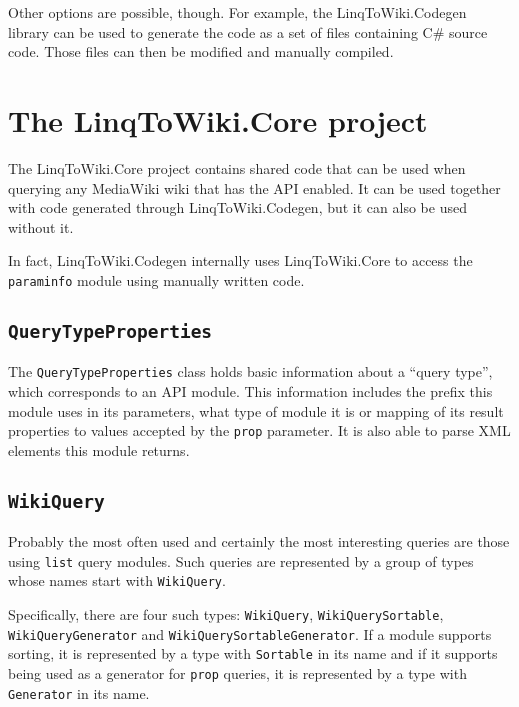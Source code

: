 Other options are possible, though.
For example, the LinqToWiki.Codegen library can be used to generate the code as a set of files containing C\# source code.
Those files can then be modified and manually compiled.

\section{The LinqToWiki.Core project}

The LinqToWiki.Core project contains shared code that can be used when querying any MediaWiki wiki
that has the API enabled.
It can be used together with code generated through LinqToWiki\allowbreak{}.Codegen,
but it can also be used without it.

In fact, LinqToWiki.\allowbreak{}Codegen internally uses LinqToWiki.Core to access the \texttt{paraminfo} module
using manually written code.

\subsection{\texorpdfstring{\lstinline{QueryTypeProperties}}{QueryTypeProperties}}

The \lstinline{QueryTypeProperties} class holds basic information about a “query type”,
which corresponds to an API module.
This information includes the prefix this module uses in its parameters,
what type of module it is or mapping of its result properties to values accepted by the \texttt{prop} parameter.
It is also able to parse XML elements this module returns.

\subsection{\texorpdfstring{\lstinline{WikiQuery}}{WikiQuery}}

Probably the most often used and certainly the most interesting queries are those using \texttt{list} query modules.
Such queries are represented by a group of types whose names start with \lstinline{WikiQuery}.

Specifically, there are four such types:
\lstinline{WikiQuery}, \lstinline{WikiQuerySortable}, \lstinline{Wiki}\lstBreak\lstinline{Query}\lstBreak\lstinline{Generator} and \lstinline{WikiQuerySortableGenerator}.
If a module supports sorting, it is represented by a type with \lstinline{Sortable} in its name
and if it supports being used as a generator for \texttt{prop} queries, it is represented by a type with \lstinline{Generator} in its name.

